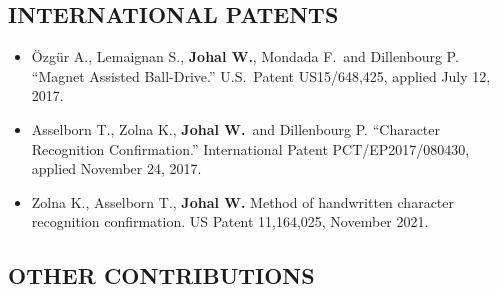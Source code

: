 \vspace{0.1in}

\subsection{INTERNATIONAL PATENTS}
\vspace{2pt}

\begin{itemize}[nosep]
    \renewcommand\labelitemi{$\bullet$}
    \item Özgür A., Lemaignan S., \textbf{Johal W.}, Mondada F.\ and Dillenbourg P. ``Magnet Assisted Ball-Drive.'' U.S.\ Patent US15/648,425, applied July 12, 2017.
    \item Asselborn T., Zolna K., \textbf{Johal W.}\ and Dillenbourg P. ``Character Recognition Confirmation.'' International Patent PCT/EP2017/080430, applied November 24, 2017.
    \item Zolna K., Asselborn T., \textbf{Johal W.} Method of handwritten character recognition confirmation. US Patent 11,164,025, November 2021.
\end{itemize}

\vspace{0.1in}

\subsection{OTHER CONTRIBUTIONS}
\vspace{2pt}

